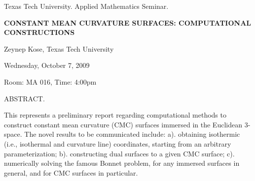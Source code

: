 \documentclass[oneside]{amsart}
\newcommand{\talktitle}{\uppercase{Constant Mean Curvature Surfaces: Computational Constructions
 }}
\newcommand{\talkspeaker}{Zeynep Kose, Texas Tech University}
\newcommand{\talkdate}{Wednesday, October 7, 2009}
\newcommand{\talkabstract}{
This represents a preliminary report regarding computational methods to construct constant mean curvature (CMC) surfaces immersed in the Euclidean 3-space. The novel results to be communicated include: a). obtaining isothermic (i.e., isothermal and curvature line) coordinates, starting from an arbitrary parameterization; b). constructing dual surfaces to a given CMC surface; c). numerically solving the famous Bonnet problem, for any immersed surfaces in general, and for CMC surfaces in particular. 
}
\begin{document}
\thispagestyle{empty}

\begin{center}
Texas Tech University.  Applied Mathematics Seminar.

\end{center}

\begin{center}

\textbf{\LARGE \talktitle}

\talkspeaker

\talkdate

Room: MA 016, Time: 4:00pm

\end{center}

ABSTRACT.
\talkabstract
\end{document}
